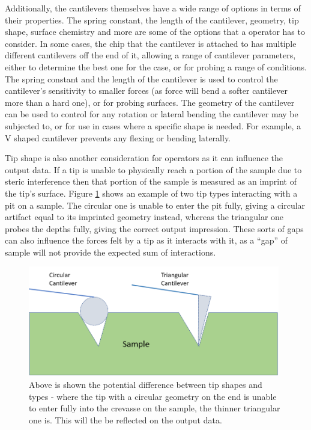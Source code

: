 Additionally, the cantilevers themselves have a wide range of options in terms of their properties. The spring constant, the length of the cantilever, geometry, tip shape, surface chemistry and more are some of the options that a operator has to consider. In some cases, the chip that the cantilever is attached to has multiple different cantilevers off the end of it, allowing a range of cantilever parameters, either to determine the best one for the case, or for probing a range of conditions. The spring constant and the length of the cantilever is used to control the cantilever's sensitivity to smaller forces (as force will bend a softer cantilever more than a hard one), or for probing surfaces. The geometry of the cantilever can be used to control for any rotation or lateral bending the cantilever may be subjected to, or for use in cases where a specific shape is needed. For example, a V shaped cantilever prevents any flexing or bending laterally.

Tip shape is also another consideration for operators as it can influence the output data. If a tip is unable to physically reach a portion of the sample due to steric interference then that portion of the sample is measured as an imprint of the tip's surface. Figure \ref{fig:tipshape} shows an example of two tip types interacting with a pit on a sample. The circular one is unable to enter the pit fully, giving a circular artifact equal to its imprinted geometry instead, whereas the triangular one probes the depths fully, giving the correct output impression. These sorts of gaps can also influence the forces felt by a tip as it interacts with it, as a ``gap'' of sample will not provide the expected sum of interactions.

\begin{figure}[h!]     %
        \begin{center}
          \includegraphics[width=110mm]{chapter2/Tip Shapes.PNG}
\end{center}
\caption{Above is shown the potential difference between tip shapes and types - where the tip with a circular geometry on the end is unable to enter fully into the crevasse on the sample, the thinner triangular one is. This will the be reflected on the output data.}
\label{fig:tipshape}                 %
\end{figure}

